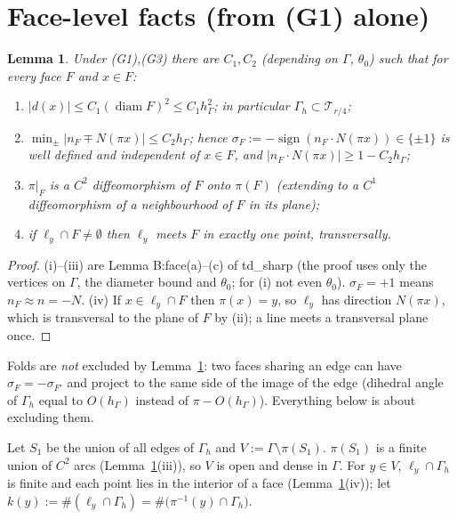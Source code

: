 \documentclass[11pt]{article}
\newtheorem{lemma}[theorem]{Lemma}
\theoremstyle{definition}
\newcommand{\hG}{h_\Gamma}
\newcommand{\Gh}{\Gamma_h}
\DeclareMathOperator{\diam}{diam}
\begin{document}
\section{Face-level facts (from (G1) alone)}
\begin{lemma}\label{lem:face}
Under (G1),(G3) there are $C_1,C_2$ (depending on $\Gamma$, $\theta_0$) such that for every face $F$ and $x\in F$:
\begin{enumerate}[label=(\roman*)]
\item $|d(x)|\le C_1(\diam F)^2\le C_1\hG^2$; in particular $\Gh\subset\mathcal T_{r/4}$;
\item $\min_{\pm}|n_F\mp N(\pi x)|\le C_2\hG$; hence $\sigma_F:=-\operatorname{sign}(n_F\cdot N(\pi x))\in\{\pm1\}$ is well defined and independent of $x\in F$, and $|n_F\cdot N(\pi x)|\ge1-C_2\hG$;
\item $\pi|_F$ is a $C^2$ diffeomorphism of $F$ onto $\pi(F)$ (extending to a $C^1$ diffeomorphism of a neighbourhood of $F$ in its plane);
\item if $\ell_y\cap F\ne\emptyset$ then $\ell_y$ meets $F$ in exactly one point, transversally.
\end{enumerate}
\end{lemma}
\begin{proof}
(i)--(iii) are Lemma B:face(a)--(c) of td\_sharp (the proof uses only the vertices on $\Gamma$, the diameter bound and $\theta_0$; for (i) not even $\theta_0$). $\sigma_F=+1$ means $n_F\approx n=-N$. (iv) If $x\in\ell_y\cap F$ then $\pi(x)=y$, so $\ell_y$ has direction $N(\pi x)$, which is transversal to the plane of $F$ by (ii); a line meets a transversal plane once.
\end{proof}
Folds are \emph{not} excluded by Lemma~\ref{lem:face}: two faces sharing an edge can have $\sigma_F=-\sigma_{F'}$ and project to the same side of the image of the edge (dihedral angle of $\Gh$ equal to $O(\hG)$ instead of $\pi-O(\hG)$). Everything below is about excluding them.

Let $S_1$ be the union of all edges of $\Gh$ and $V:=\Gamma\setminus\pi(S_1)$. $\pi(S_1)$ is a finite union of $C^2$ arcs (Lemma~\ref{lem:face}(iii)), so $V$ is open and dense in $\Gamma$. For $y\in V$, $\ell_y\cap\Gh$ is finite and each point lies in the interior of a face (Lemma~\ref{lem:face}(iv)); let $k(y):=\#(\ell_y\cap\Gh)=\#\bigl(\pi^{-1}(y)\cap\Gh\bigr)$.
\end{document}
